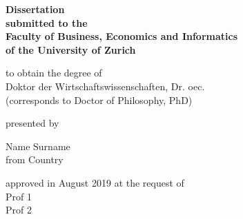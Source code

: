 \begin{titlepage}
    \begin{center}
    
        \hfill

        \vfill

        \begingroup
            \LARGE
        \endgroup

        \vfill

        \begingroup
            \textbf{Dissertation \\
            submitted to the \\
            Faculty of Business, Economics and Informatics \\
            of the University of Zurich} 
        \endgroup

        \vfill
        
        \begingroup
            to obtain the degree of \\
            Doktor der Wirtschaftswissenschaften, Dr. oec. \\ 
            (corresponds to Doctor of Philosophy, PhD)
        \endgroup

        \vfill

        \begingroup
            presented by\\
        \endgroup
        
        \vfill
        
        \begingroup
            \vspace{0.5em}
            Name Surname\\
            from Country
        \endgroup

        \vfill

        \begingroup
            approved in August 2019 at the request of \\ %
            Prof 1 \\
            Prof 2
        \endgroup

        \vfill

        \vfill
    \end{center}
\end{titlepage}
